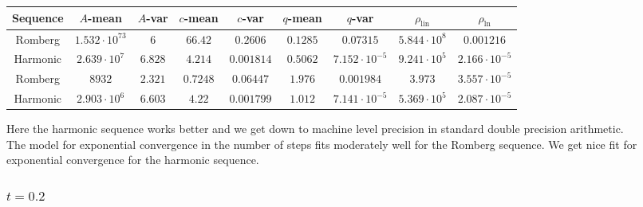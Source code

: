\begin{table}[H]
    \centering\small
    \begin{tabular}{c||c|c|c|c|c|c|c|c}
Sequence & \(A\)-mean & \(A\)-var & \(c\)-mean & \(c\)-var & \(q\)-mean & \(q\)-var & \(\rho_{\operatorname{lin}}\) & \(\rho_{\ln}\)\\\hline
\rowcolor{red}
Romberg & \(1.532\cdot 10^{73}\) & \(6\) & \(66.42\) & \(0.2606\) & \(0.1285\) & \(0.07315\) & \(5.844\cdot 10^8\) & \(0.001216\) \\
\rowcolor{green}
Harmonic & \(2.639\cdot 10^7\) & \(6.828\) & \(4.214\) & \(0.001814\) & \(0.5062\) & \(7.152\cdot 10^{-5}\) & \(9.241\cdot 10^5\) & \(2.166\cdot 10^{-5}\) \\
\rowcolor{green}
Romberg & \(8932\) & \(2.321\) & \(0.7248\) & \(0.06447\) & \(1.976\) & \(0.001984\) & \(3.973\) & \(3.557\cdot 10^{-5}\) \\
\rowcolor{green}
Harmonic & \(2.903\cdot 10^6\) & \(6.603\) & \(4.22\) & \(0.001799\) & \(1.012\) & \(7.141\cdot 10^{-5}\) & \(5.369\cdot 10^5\) & \(2.087\cdot 10^{-5}\) \\
    \end{tabular}
    \label{tab:my_label}
\end{table}

Here the harmonic sequence works better and we get down to machine level precision in standard double precision arithmetic.\\

The model for exponential convergence in the number of steps fits moderately well for the Romberg sequence. We get nice fit for exponential convergence for the harmonic sequence.

\subsubsection{\(t = 0.2\)}

